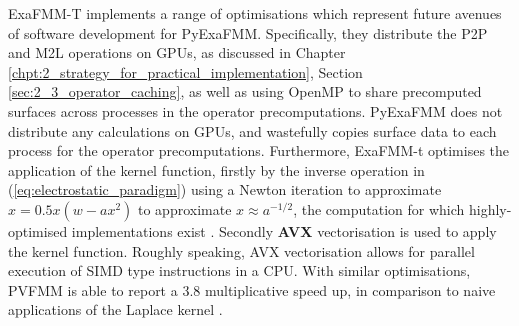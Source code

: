 ExaFMM-T implements a range of optimisations which represent future avenues
of software development for \gls{PyExaFMM}. Specifically, they distribute the
\gls{P2P} and \gls{M2L} operations on \gls{GPU}s, as discussed in Chapter
\ref{chpt:2_strategy_for_practical_implementation},
Section \ref{sec:2_3_operator_caching}, as well as using \gls{OpenMP} to share
precomputed surfaces across processes in the operator precomputations.
\gls{PyExaFMM} does not distribute any calculations on \gls{GPU}s, and
wastefully copies surface data to each process for the operator precomputations.
Furthermore, ExaFMM-t optimises the application of the kernel function,
firstly by the inverse operation in (\ref{eq:electrostatic_paradigm}) using a Newton
iteration to approximate $x = 0.5x(w-ax^2)$ to approximate $x \approx a ^{-1/2}$,
the computation for which highly-optimised implementations exist
\cite{Lomont:2003, sqrt}. Secondly \textbf{\gls{AVX}} vectorisation is used
to apply the kernel function. Roughly speaking, \gls{AVX} vectorisation allows
for parallel execution of \gls{SIMD} type instructions in a \gls{CPU}. With similar
optimisations, PVFMM is able to report a 3.8 multiplicative speed up, in
comparison to naive applications of the Laplace kernel \cite{Malhotra:2015:CCP}.
